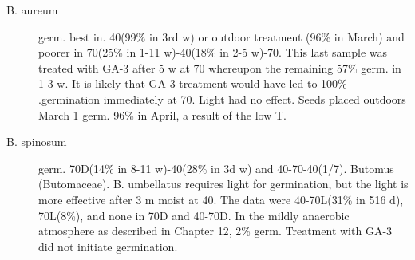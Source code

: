\begin{description}
\item[B. aureum] germ. best in. 40(99\% in 3rd w) or outdoor treatment (96\% in March)
and poorer in 70(25\% in 1-11 w)-40(18\% in 2-5 w)-70. This last sample was treated
with GA-3 after 5 w at 70 whereupon the remaining 57\% germ. in 1-3 w. It is likely that
GA-3 treatment would have led to 100\% .germination immediately at 70. Light had no
effect. Seeds placed outdoors March 1 germ. 96\% in April, a result of the low T.
\item[B. spinosum] germ. 70D(14\% in 8-11 w)-40(28\% in 3d w) and 40-70-40(1/7).
Butomus (Butomaceae). B. umbellatus requires light for germination, but
the light is more effective after 3 m moist at 40. The data were 40-70L(31\% in 516 d),
70L(8\%), and none in 70D and 40-70D. In the mildly anaerobic atmosphere as
described in Chapter 12, 2\% germ. Treatment with GA-3 did not initiate germination.

\end{description}
